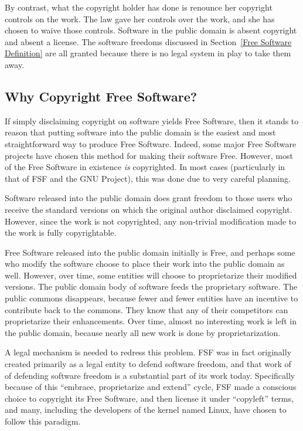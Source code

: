 \documentclass[12pt]{report}
\begin{document}
By contrast, what the copyright holder has done is renounce her copyright
controls on the work.  The law gave her controls over the work, and she
has chosen to waive those controls.  Software in the public domain is
absent copyright and absent a license.  The software freedoms discussed in
Section~\ref{Free Software Definition} are all granted because there is no
legal system in play to take them away.

\subsection{Why Copyright Free Software?}

If simply disclaiming copyright on software yields Free Software, then it
stands to reason that putting software into the public domain is the
easiest and most straightforward way to produce Free Software.  Indeed,
some major Free Software projects have chosen this method for making their
software Free.  However, most of the Free Software in existence \emph{is}
copyrighted.  In most cases (particularly in that of FSF and the GNU
Project), this was done due to very careful planning.

Software released into the public domain does grant freedom to those users
who receive the standard versions on which the original author disclaimed
copyright.  However, since the work is not copyrighted, any non-trivial
modification made to the work is fully copyrightable.

Free Software released into the public domain initially is Free, and
perhaps some who modify the software choose to place their work into the
public domain as well.  However, over time, some entities will choose to
proprietarize their modified versions.  The public domain body of software
feeds the proprietary software.  The public commons disappears, because
fewer and fewer entities have an incentive to contribute back to the
commons.  They know that any of their competitors can proprietarize their
enhancements.  Over time, almost no interesting work is left in the public
domain, because nearly all new work is done by proprietarization.

A legal mechanism is needed to redress this problem.  FSF was in fact
originally created primarily as a legal entity to defend software freedom,
and that work of of defending software freedom is a substantial part of
its work today.  Specifically because of this ``embrace, proprietarize and
extend'' cycle, FSF made a conscious choice to copyright its Free Software,
and then license it under ``copyleft'' terms, and many, including the
developers of the kernel named Linux, have chosen to follow this paradigm.
\end{document}
